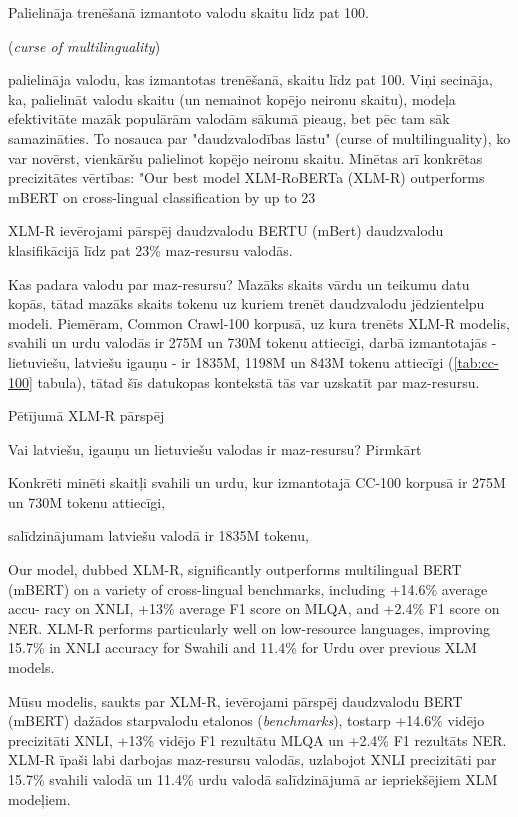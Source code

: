Palielināja trenēšanā izmantoto valodu skaitu līdz pat 100.


(\textit{curse of multilinguality})


palielināja valodu, kas izmantotas trenēšanā, skaitu līdz pat 100. Viņi secināja, ka, palielināt valodu skaitu (un nemainot kopējo neironu skaitu), modeļa efektivitāte mazāk populārām valodām sākumā pieaug, bet pēc tam sāk samazināties. To nosauca par "daudzvalodības lāstu" (curse of multilinguality), ko var novērst, vienkāršu palielinot kopējo neironu skaitu. Minētas arī konkrētas precizitātes vērtības: "Our best model XLM-RoBERTa (XLM-R) outperforms mBERT on cross-lingual classification by up to 23%



XLM-R ievērojami pārspēj daudzvalodu BERTU (mBert) daudzvalodu klasifikācijā līdz pat 23\% maz-resursu valodās.

Kas padara valodu par maz-resursu? Mazāks skaits vārdu un teikumu datu kopās, tātad mazāks skaits tokenu uz kuriem trenēt daudzvalodu jēdzientelpu modeli. Piemēram, Common Crawl-100 korpusā, uz kura trenēts XLM-R modelis, svahili un urdu valodās ir 275M un 730M tokenu attiecīgi, darbā izmantotajās - lietuviešu, latviešu igauņu - ir 1835M, 1198M un 843M tokenu attiecīgi (\ref{tab:cc-100} tabula), tātad šīs datukopas kontekstā tās var uzskatīt par maz-resursu. 

Pētījumā XLM-R pārspēj 

Vai latviešu, igauņu un lietuviešu valodas ir maz-resursu? Pirmkārt


Konkrēti minēti skaitļi svahili un urdu, kur izmantotajā CC-100 korpusā ir 275M un 730M tokenu attiecīgi,

salīdzinājumam latviešu valodā ir 1835M tokenu, 


Our model, dubbed XLM-R, significantly outperforms multilingual BERT (mBERT) on a variety of cross-lingual benchmarks, including +14.6\% average accu- racy on XNLI, +13\% average F1 score on MLQA, and +2.4\% F1 score on NER. XLM-R performs particularly well on low-resource languages, improving 15.7\% in XNLI accuracy for Swahili and 11.4\% for Urdu over previous XLM models. 


Mūsu modelis, saukts par XLM-R, ievērojami pārspēj daudzvalodu BERT (mBERT) dažādos starpvalodu etalonos (\textit{benchmarks}), tostarp +14.6\% vidējo precizitāti XNLI, +13\% vidējo F1 rezultātu MLQA un +2.4\% F1 rezultāts NER. XLM-R īpaši labi darbojas maz-resursu valodās, uzlabojot XNLI precizitāti par 15.7\% svahili valodā un 11.4\% urdu valodā salīdzinājumā ar iepriekšējiem XLM modeļiem.


